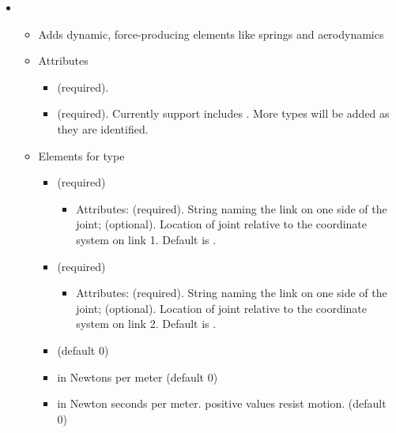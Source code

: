 \begin{itemize}
\item {}
\begin{itemize}
\item Adds dynamic, force-producing elements like springs and
  aerodynamics
\item Attributes
\begin{itemize}
\item {} (required).
\item {} (required).  Currently support includes
  .  More types will be added as they are identified.
\end{itemize}

\item Elements for type 
\begin{itemize}
\item {} (required)  
\begin{itemize}
\item Attributes:  (required). String naming the link on
  one side of the joint;  (optional). Location of joint relative to the coordinate system on link 1. Default is .
\end{itemize}
\item {} (required)
\begin{itemize}
\item Attributes:  (required). String naming the link on
  one side of the joint;  (optional). Location of joint relative to the coordinate system on link 2. Default is .
\end{itemize}
\item {} (default 0)
\item {} in Newtons per meter (default 0)
\item {} in Newton seconds per meter.  positive values
  resist motion.  (default 0)
\end{itemize}


\end{itemize}
\end{itemize}
